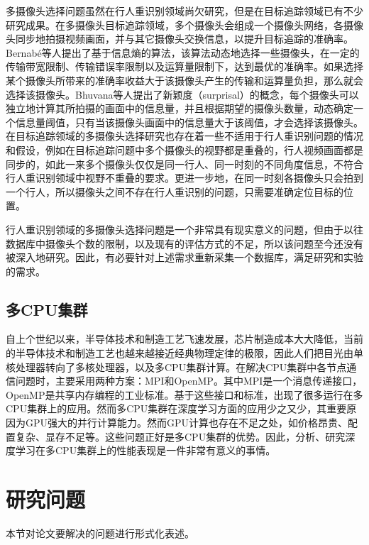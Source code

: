多摄像头选择问题虽然在行人重识别领域尚欠研究，但是在目标追踪领域已有不少研究成果。在多摄像头目标追踪领域，多个摄像头会组成一个摄像头网络，各摄像头同步地拍摄视频画面，并与其它摄像头交换信息，以提升目标追踪的准确率。Bernab{\'e}等人\cite{de2012entropy}提出了基于信息熵的算法，该算法动态地选择一些摄像头，在一定的传输带宽限制、传输错误率限制以及运算量限制下，达到最优的准确率。如果选择某个摄像头所带来的准确率收益大于该摄像头产生的传输和运算量负担，那么就会选择该摄像头。Bhuvana等人\cite{bhuvana2016multi}提出了新颖度（surprisal）的概念，每个摄像头可以独立地计算其所拍摄的画面中的信息量，并且根据期望的摄像头数量，动态确定一个信息量阈值，只有当该摄像头画面中的信息量大于该阈值，才会选择该摄像头。在目标追踪领域的多摄像头选择研究也存在着一些不适用于行人重识别问题的情况和假设，例如在目标追踪问题中多个摄像头的视野都是重叠的，行人视频画面都是同步的，如此一来多个摄像头仅仅是同一行人、同一时刻的不同角度信息，不符合行人重识别领域中视野不重叠的要求。更进一步地，在同一时刻各摄像头只会拍到一个行人，所以摄像头之间不存在行人重识别的问题，只需要准确定位目标的位置。

行人重识别领域的多摄像头选择问题是一个非常具有现实意义的问题，但由于以往数据库中摄像头个数的限制，以及现有的评估方式的不足，所以该问题至今还没有被深入地研究。因此，有必要针对上述需求重新采集一个数据库，满足研究和实验的需求。

\subsection{多CPU集群}

自上个世纪以来，半导体技术和制造工艺飞速发展，芯片制造成本大大降低，当前的半导体技术和制造工艺也越来越接近经典物理定律的极限，因此人们把目光由单核处理器转向了多核处理器，以及多CPU集群计算。在解决CPU集群中各节点通信问题时，主要采用两种方案：MPI\cite{sur2006high}和OpenMP\cite{dagum1998openmp}。其中MPI是一个消息传递接口，OpenMP是共享内存编程的工业标准。基于这些接口和标准，出现了很多运行在多CPU集群上的应用\cite{rabenseifner2009hybrid,ayguade2009design}。然而多CPU集群在深度学习方面的应用少之又少，其重要原因为GPU强大的并行计算能力。然而GPU计算也存在不足之处，如价格昂贵、配置复杂、显存不足等。这些问题正好是多CPU集群的优势。因此，分析、研究深度学习在多CPU集群上的性能表现是一件非常有意义的事情。

\section{研究问题}

本节对论文要解决的问题进行形式化表述。

